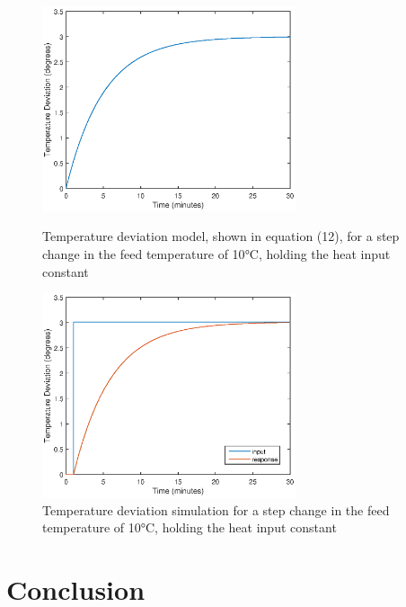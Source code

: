 \documentclass{article}
\begin{document}
\begin{figure}[h]
\begin{minipage}{0.45\textwidth}
\centering
\includegraphics[height=6cm]{1b_mod}
\caption{Temperature deviation model, shown in equation (12), for a step change in the feed temperature of 10$\si{\degreeCelsius}$, holding the heat input constant}
\end{minipage}
\hspace{1cm}
\begin{minipage}{0.45\textwidth}
\centering
\includegraphics[height=6cm]{1b_sim}
\caption{Temperature deviation simulation for a step change in the feed temperature of 10$\si{\degreeCelsius}$, holding the heat input constant}
\end{minipage}
\end{figure}



\section{Conclusion}
\end{document}
